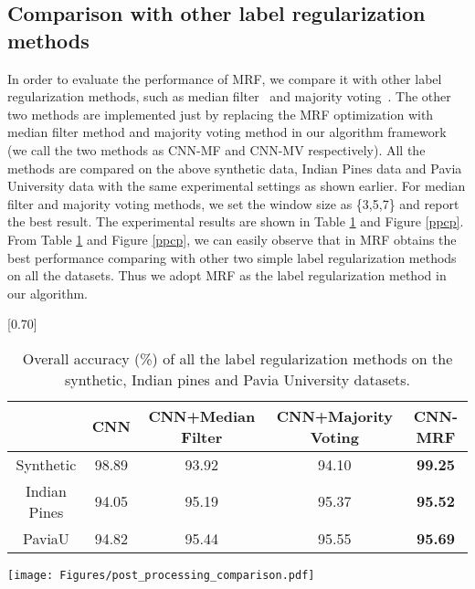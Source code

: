 \documentclass[journal]{IEEEtran}
\begin{document}
		
		{{\subsection{Comparison with other label regularization methods}\label{sec.otherpostprocess}
				In order to evaluate the performance of MRF, we compare it with other label regularization methods, such as median filter~\cite{Huang1979A} and majority voting~\cite{Boyer1991MJRTY}. The other two methods are implemented just by replacing the MRF optimization with median filter method and majority voting method in our algorithm framework (we call the two methods as CNN-MF and CNN-MV respectively). All the methods are compared on the above synthetic data, Indian Pines data and Pavia University data with the same experimental settings as shown earlier. For median filter and majority voting methods, we set the window size as \{3,5,7\} and report the best result. The experimental results are shown in Table \ref{label_regularization} and Figure \ref{ppcp}. From Table \ref{label_regularization} and Figure \ref{ppcp}, we can easily observe that in MRF obtains the best performance comparing with other two simple label regularization methods on all the datasets. Thus we adopt MRF as the label regularization 
method in 
				our algorithm.}}  
		
		\begin{table}[htp]
			\caption{\label{label_regularization} {{Overall accuracy (\%) of all the label regularization methods on the synthetic, Indian pines and Pavia University datasets.}}}
			\begin{center}
				{\normalsize
					\scalebox{0.70}[0.70]
					{
						\begin{tabular}{|c|c|c|c|c|}
							\hline
							& CNN     & CNN+Median Filter & CNN+Majority Voting  & CNN-MRF \\
							\hline
							Synthetic & 98.89   & 93.92    &  94.10     & \bf{99.25} \\
							\hline
							Indian Pines  & 94.05   & 95.19    &  95.37     & \bf{95.52} \\
							\hline
							PaviaU    & 94.82   & 95.44    &  95.55     & \bf{95.69} \\
							\hline
							
						\end{tabular}
					}
				}
			\end{center}
		\end{table}
		
		\begin{figure*}
			\centering
			\texttt{[image: Figures/post\_processing\_comparison.pdf]}
			\caption{{{Classification maps obtained by all competing methods on the Pavia University dataset (overall accuracies are reported in parentheses).}}}\label{ppcp}
		\end{figure*}
		
\end{document}
